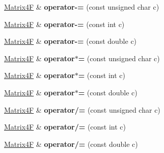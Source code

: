 \begin{DoxyCompactItemize}
\item 
\hypertarget{class_matrix4_f_a051c1bd27b5ac19c1ce17287b9527dcf}{\hyperlink{class_matrix4_f}{Matrix4\+F} \& {\bfseries operator-\/=} (const unsigned char c)}\label{class_matrix4_f_a051c1bd27b5ac19c1ce17287b9527dcf}

\item 
\hypertarget{class_matrix4_f_a87de33f8946cc22701e9f1ef62fc9fd2}{\hyperlink{class_matrix4_f}{Matrix4\+F} \& {\bfseries operator-\/=} (const int c)}\label{class_matrix4_f_a87de33f8946cc22701e9f1ef62fc9fd2}

\item 
\hypertarget{class_matrix4_f_a0de9fab253dfb486b54ff037713fd8d7}{\hyperlink{class_matrix4_f}{Matrix4\+F} \& {\bfseries operator-\/=} (const double c)}\label{class_matrix4_f_a0de9fab253dfb486b54ff037713fd8d7}

\item 
\hypertarget{class_matrix4_f_aab81ae73a340a09bf69e29787dc93b31}{\hyperlink{class_matrix4_f}{Matrix4\+F} \& {\bfseries operator$\ast$=} (const unsigned char c)}\label{class_matrix4_f_aab81ae73a340a09bf69e29787dc93b31}

\item 
\hypertarget{class_matrix4_f_aebd6f897cf52a98dcebe0974bf8ef572}{\hyperlink{class_matrix4_f}{Matrix4\+F} \& {\bfseries operator$\ast$=} (const int c)}\label{class_matrix4_f_aebd6f897cf52a98dcebe0974bf8ef572}

\item 
\hypertarget{class_matrix4_f_a9979542e03782b44d0190e84e3b43624}{\hyperlink{class_matrix4_f}{Matrix4\+F} \& {\bfseries operator$\ast$=} (const double c)}\label{class_matrix4_f_a9979542e03782b44d0190e84e3b43624}

\item 
\hypertarget{class_matrix4_f_a43cf5969e0bef6843e252419ebdf422a}{\hyperlink{class_matrix4_f}{Matrix4\+F} \& {\bfseries operator/=} (const unsigned char c)}\label{class_matrix4_f_a43cf5969e0bef6843e252419ebdf422a}

\item 
\hypertarget{class_matrix4_f_afbc6dac951a6ed83ad5edaaff7dc6f34}{\hyperlink{class_matrix4_f}{Matrix4\+F} \& {\bfseries operator/=} (const int c)}\label{class_matrix4_f_afbc6dac951a6ed83ad5edaaff7dc6f34}

\item 
\hypertarget{class_matrix4_f_a144d7628ba879a1d518e03d925ad5a0a}{\hyperlink{class_matrix4_f}{Matrix4\+F} \& {\bfseries operator/=} (const double c)}\label{class_matrix4_f_a144d7628ba879a1d518e03d925ad5a0a}


\end{DoxyCompactItemize}
